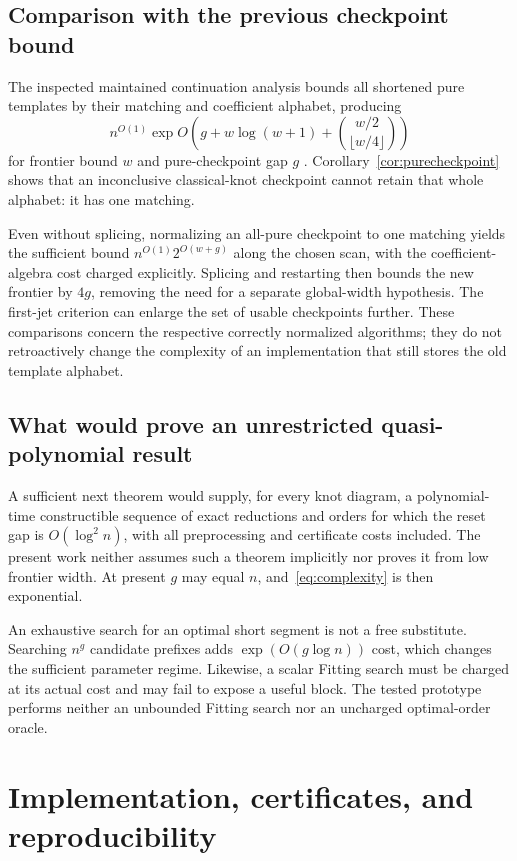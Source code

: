 \documentclass[11pt]{article}
\theoremstyle{definition}\newtheorem{definition}[theorem]{Definition}\newtheorem{example}[theorem]{Example}
\theoremstyle{remark}\newtheorem{remark}[theorem]{Remark}
\begin{document}
\subsection{Comparison with the previous checkpoint bound}
The inspected maintained continuation analysis bounds all shortened pure templates by their matching and coefficient alphabet, producing
\begin{equation}\label{eq:oldbound}
 n^{O(1)}\exp O\left(g+w\log(w+1)+\binom{w/2}{\lfloor w/4\rfloor}\right)
\end{equation}
for frontier bound $w$ and pure-checkpoint gap $g$ \cite{ProveIt}. Corollary~\ref{cor:purecheckpoint} shows that an inconclusive classical-knot checkpoint cannot retain that whole alphabet: it has one matching.

Even without splicing, normalizing an all-pure checkpoint to one matching yields the sufficient bound $n^{O(1)}2^{O(w+g)}$ along the chosen scan, with the coefficient-algebra cost charged explicitly. Splicing and restarting then bounds the new frontier by $4g$, removing the need for a separate global-width hypothesis. The first-jet criterion can enlarge the set of usable checkpoints further. These comparisons concern the respective correctly normalized algorithms; they do not retroactively change the complexity of an implementation that still stores the old template alphabet.

\subsection{What would prove an unrestricted quasi-polynomial result}
A sufficient next theorem would supply, for every knot diagram, a polynomial-time constructible sequence of exact reductions and orders for which the reset gap is $O(\log^2 n)$, with all preprocessing and certificate costs included. The present work neither assumes such a theorem implicitly nor proves it from low frontier width. At present $g$ may equal $n$, and~\eqref{eq:complexity} is then exponential.

An exhaustive search for an optimal short segment is not a free substitute. Searching $n^g$ candidate prefixes adds $\exp(O(g\log n))$ cost, which changes the sufficient parameter regime. Likewise, a scalar Fitting search must be charged at its actual cost and may fail to expose a useful block. The tested prototype performs neither an unbounded Fitting search nor an uncharged optimal-order oracle.

\section{Implementation, certificates, and reproducibility}
\end{document}
